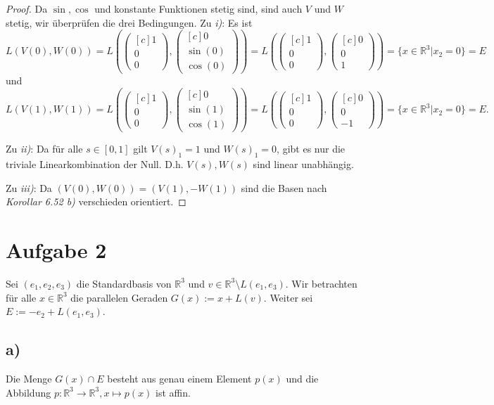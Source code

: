 \documentclass{article}
\newcommand{\RR}{\mathbb{R}}
\newcommand{\vect}[1]{\begin{pmatrix*}[c] #1 \end{pmatrix*}}
\begin{document}
\begin{proof}
  Da $\sin,\cos$ und konstante Funktionen stetig sind,
  sind auch $V$ und $W$ stetig, wir überprüfen die drei Bedingungen.
  Zu  \textit{i)}:
  Es ist
  $$
  L(V(0),W(0)) = L\left(\vect{1 \\ 0 \\ 0} , \vect{0 \\ \sin(0) \\ \cos(0)}\right)
  = L\left(\vect{1 \\ 0 \\ 0} , \vect{0 \\ 0 \\ 1}\right)
  = \{ x \in \RR^3 | x_2 = 0 \} = E
  $$
  und
  $$
  L(V(1),W(1)) =  L\left(\vect{1 \\ 0 \\ 0} , \vect{0 \\ \sin(1) \\ \cos(1)}\right)
  = L\left(\vect{1 \\ 0 \\ 0} , \vect{0 \\ 0 \\ -1}\right)
  = \{ x \in \RR^3 | x_2 = 0 \} = E.
  $$

  Zu \textit{ii)}:
  Da für alle $s \in [0,1]$ gilt $V(s)_1 = 1$ und
  $W(s)_1 = 0$, gibt es nur die triviale Linearkombination der Null.
  D.h. $V(s),W(s)$ sind linear unabhängig.

  Zu \textit{iii)}:
  Da $(V(0), W(0)) = (V (1), -W(1))$ sind die Basen nach \textit{Korollar 6.52 b)}
  verschieden orientiert.
\end{proof}


\newpage


\section*{Aufgabe 2}

Sei $(e_1, e_2, e_3)$ die Standardbasis von $\RR^3$ und $v \in \RR^3 \setminus L(e_1, e_3)$.
Wir betrachten für alle $x \in \RR^3$ die parallelen
Geraden $G(x) := x+L(v)$. Weiter sei $E := -e_2 + L(e_1, e_3)$.

\subsection*{a)}
Die Menge $G(x) \cap E$ besteht aus genau einem Element $p(x)$ und
die Abbildung $p : \RR^3 \to \RR^3, x \mapsto p(x)$ ist affin.
\end{document}
